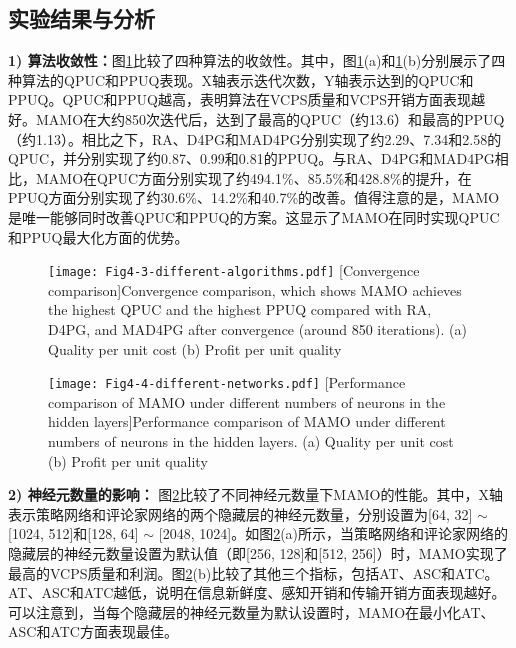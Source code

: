 \subsection[\hspace{-2pt}实验结果与分析]{{ \hspace{-8pt}实验结果与分析}}

\textbf{1) 算法收敛性：}图\ref{fig 4-3}比较了四种算法的收敛性。其中，图\ref{fig 4-3}(a)和\ref{fig 4-3}(b)分别展示了四种算法的QPUC和PPUQ表现。X轴表示迭代次数，Y轴表示达到的QPUC和PPUQ。QPUC和PPUQ越高，表明算法在VCPS质量和VCPS开销方面表现越好。MAMO在大约850次迭代后，达到了最高的QPUC（约13.6）和最高的PPUQ（约1.13）。相比之下，RA、D4PG和MAD4PG分别实现了约2.29、7.34和2.58的QPUC，并分别实现了约0.87、0.99和0.81的PPUQ。与RA、D4PG和MAD4PG相比，MAMO在QPUC方面分别实现了约494.1\%、85.5\%和428.8\%的提升，在PPUQ方面分别实现了约30.6\%、14.2\%和40.7\%的改善。值得注意的是，MAMO是唯一能够同时改善QPUC和PPUQ的方案。这显示了MAMO在同时实现QPUC和PPUQ最大化方面的优势。

\begin{figure}[h]
 \centering
 \texttt{[image: Fig4-3-different-algorithms.pdf]}
 [Convergence comparison]{Convergence comparison, which shows MAMO achieves the highest QPUC and the highest PPUQ compared with RA, D4PG, and MAD4PG after convergence (around 850 iterations). (a) Quality per unit cost (b) Profit per unit quality}
 \label{fig 4-3}
\end{figure}

\begin{figure}[h]
 \centering
 \texttt{[image: Fig4-4-different-networks.pdf]}
 [Performance comparison of MAMO under different numbers of neurons in the hidden layers]{Performance comparison of MAMO under different numbers of neurons in the hidden layers. (a) Quality per unit cost (b) Profit per unit quality}
 \label{fig 4-4}
\end{figure}

\textbf{2) 神经元数量的影响：}
图\ref{fig 4-4}比较了不同神经元数量下MAMO的性能。其中，X轴表示策略网络和评论家网络的两个隐藏层的神经元数量，分别设置为[64, 32] $\sim$ [1024, 512]和[128, 64] $\sim$ [2048, 1024]。如图\ref{fig 4-4}(a)所示，当策略网络和评论家网络的隐藏层的神经元数量设置为默认值（即[256, 128]和[512, 256]）时，MAMO实现了最高的VCPS质量和利润。图\ref{fig 4-4}(b)比较了其他三个指标，包括AT、ASC和ATC。AT、ASC和ATC越低，说明在信息新鲜度、感知开销和传输开销方面表现越好。可以注意到，当每个隐藏层的神经元数量为默认设置时，MAMO在最小化AT、ASC和ATC方面表现最佳。

